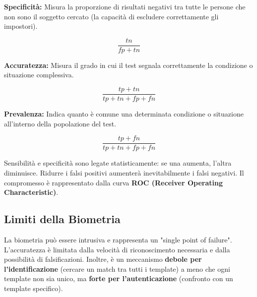 \documentclass{article}
\begin{document}
\vspace{0.3cm}
\noindent \begin{minipage}{0.48\textwidth}
    \textbf{Specificità:} Misura la proporzione di risultati negativi tra tutte le persone che non sono il soggetto cercato (la capacità di escludere correttamente gli impostori).
\end{minipage}
\hfill
\begin{minipage}{0.48\textwidth}
    \begin{equation*}
        \frac{tn}{fp + tn}
    \end{equation*}
\end{minipage}

\vspace{0.3cm}
\noindent \begin{minipage}{0.48\textwidth}
    \textbf{Accuratezza:} Misura il grado in cui il test segnala correttamente la condizione o situazione complessiva.
\end{minipage}
\hfill
\begin{minipage}{0.48\textwidth}
    \begin{equation*}
        \frac{tp + tn}{tp + tn + fp + fn}
    \end{equation*}
\end{minipage}

\vspace{0.3cm}
\noindent \begin{minipage}{0.48\textwidth}
    \textbf{Prevalenza:} Indica quanto è comune una determinata condizione o situazione all'interno della popolazione del test.
\end{minipage}
\hfill
\begin{minipage}{0.48\textwidth}
    \begin{equation*}
        \frac{tp + fn}{tp + tn + fp + fn}
    \end{equation*}
\end{minipage}

\vspace{0.5cm}
Sensibilità e specificità sono legate statisticamente: se una aumenta, l'altra diminuisce. Ridurre i falsi positivi aumenterà inevitabilmente i falsi negativi. Il compromesso è rappresentato dalla curva \textbf{ROC (Receiver Operating Characteristic)}.

\subsection*{Limiti della Biometria}

La biometria può essere intrusiva e rappresenta un "single point of failure". L'accuratezza è limitata dalla velocità di riconoscimento necessaria e dalla possibilità di falsificazioni. Inoltre, è un meccanismo \textbf{debole per l'identificazione} (cercare un match tra tutti i template) a meno che ogni template non sia unico, ma \textbf{forte per l'autenticazione} (confronto con un template specifico).
\end{document}
